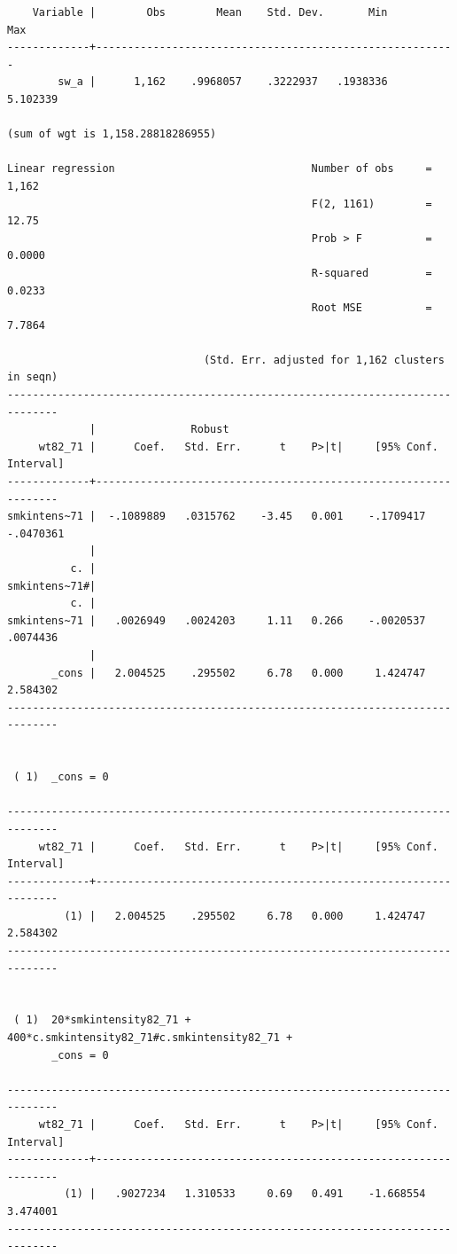 \documentclass[
  10pt,
]{book}
\begin{document}
\begin{verbatim}
    Variable |        Obs        Mean    Std. Dev.       Min        Max
-------------+---------------------------------------------------------
        sw_a |      1,162    .9968057    .3222937   .1938336   5.102339

(sum of wgt is 1,158.28818286955)

Linear regression                               Number of obs     =      1,162
                                                F(2, 1161)        =      12.75
                                                Prob > F          =     0.0000
                                                R-squared         =     0.0233
                                                Root MSE          =     7.7864

                               (Std. Err. adjusted for 1,162 clusters in seqn)
------------------------------------------------------------------------------
             |               Robust
     wt82_71 |      Coef.   Std. Err.      t    P>|t|     [95% Conf. Interval]
-------------+----------------------------------------------------------------
smkintens~71 |  -.1089889   .0315762    -3.45   0.001    -.1709417   -.0470361
             |
          c. |
smkintens~71#|
          c. |
smkintens~71 |   .0026949   .0024203     1.11   0.266    -.0020537    .0074436
             |
       _cons |   2.004525    .295502     6.78   0.000     1.424747    2.584302
------------------------------------------------------------------------------


 ( 1)  _cons = 0

------------------------------------------------------------------------------
     wt82_71 |      Coef.   Std. Err.      t    P>|t|     [95% Conf. Interval]
-------------+----------------------------------------------------------------
         (1) |   2.004525    .295502     6.78   0.000     1.424747    2.584302
------------------------------------------------------------------------------


 ( 1)  20*smkintensity82_71 + 400*c.smkintensity82_71#c.smkintensity82_71 +
       _cons = 0

------------------------------------------------------------------------------
     wt82_71 |      Coef.   Std. Err.      t    P>|t|     [95% Conf. Interval]
-------------+----------------------------------------------------------------
         (1) |   .9027234   1.310533     0.69   0.491    -1.668554    3.474001
------------------------------------------------------------------------------
\end{verbatim}
\end{document}
